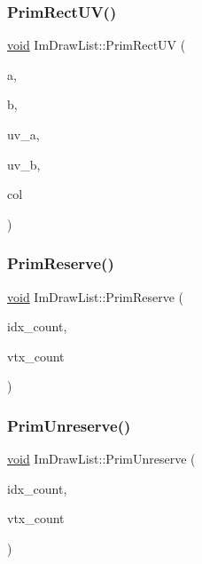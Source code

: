 \mbox{\label{structImDrawList_a77d48ed5b33ccdd908824c0a3bebfff8}} 
\subsubsection{\texorpdfstring{Prim\+Rect\+U\+V()}{PrimRectUV()}}
{\footnotesize\ttfamily \hyperlink{imgui__impl__opengl3__loader_8h_ac668e7cffd9e2e9cfee428b9b2f34fa7}{void} Im\+Draw\+List\+::\+Prim\+Rect\+UV (\begin{DoxyParamCaption}\item[{const \hyperlink{structImVec2}{Im\+Vec2} \&}]{a,  }\item[{const \hyperlink{structImVec2}{Im\+Vec2} \&}]{b,  }\item[{const \hyperlink{structImVec2}{Im\+Vec2} \&}]{uv\+\_\+a,  }\item[{const \hyperlink{structImVec2}{Im\+Vec2} \&}]{uv\+\_\+b,  }\item[{Im\+U32}]{col }\end{DoxyParamCaption})}

\mbox{\label{structImDrawList_a879aa38dbfb0344e3e023d65c002c7d7}} 
\subsubsection{\texorpdfstring{Prim\+Reserve()}{PrimReserve()}}
{\footnotesize\ttfamily \hyperlink{imgui__impl__opengl3__loader_8h_ac668e7cffd9e2e9cfee428b9b2f34fa7}{void} Im\+Draw\+List\+::\+Prim\+Reserve (\begin{DoxyParamCaption}\item[{int}]{idx\+\_\+count,  }\item[{int}]{vtx\+\_\+count }\end{DoxyParamCaption})}

\mbox{\label{structImDrawList_a618a5e0efdefce08daa888b45bf8a1d1}} 
\subsubsection{\texorpdfstring{Prim\+Unreserve()}{PrimUnreserve()}}
{\footnotesize\ttfamily \hyperlink{imgui__impl__opengl3__loader_8h_ac668e7cffd9e2e9cfee428b9b2f34fa7}{void} Im\+Draw\+List\+::\+Prim\+Unreserve (\begin{DoxyParamCaption}\item[{int}]{idx\+\_\+count,  }\item[{int}]{vtx\+\_\+count }\end{DoxyParamCaption})}

